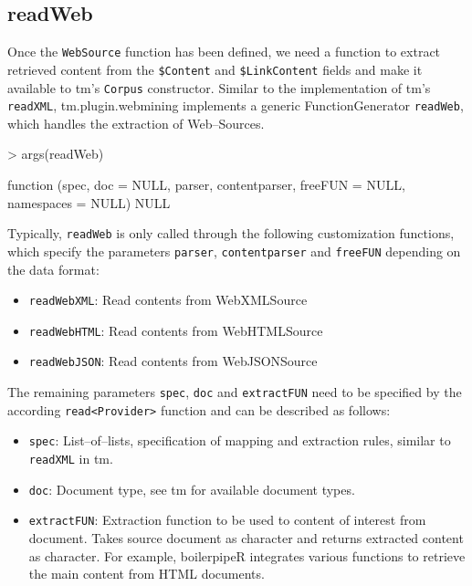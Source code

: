 \documentclass[a4paper]{article}
\let\code=\texttt
\newcommand{\class}[1]{\mbox{\textsf{#1}}}
\newcommand{\pkg}[1]{{\normalfont\fontseries{b}\selectfont #1}}
\newcommand{\proglang}[1]{\textsf{#1}}
\newcommand{\fkt}[1]{\code{#1}}
\newcommand{\field}[1]{\code{\$#1}}
\begin{document}
\subsection{readWeb}
Once the \fkt{WebSource} function has been defined, we need a function to extract retrieved content from
the \field{Content} and \field{LinkContent} fields and make it available to \pkg{tm}'s \fkt{Corpus}
constructor. Similar to the implementation of \pkg{tm}'s \fkt{readXML}, \pkg{tm.plugin.webmining} implements a 
generic \class{FunctionGenerator} \fkt{readWeb}, which handles the extraction of Web--\class{Source}s.

\begin{Schunk}
\begin{Sinput}
> args(readWeb)
\end{Sinput}
\begin{Soutput}
function (spec, doc = NULL, parser, contentparser, freeFUN = NULL, 
    namespaces = NULL) 
NULL
\end{Soutput}
\end{Schunk}

Typically, \fkt{readWeb} is only called through the following customization functions, which specify
the parameters \code{parser}, \code{contentparser} and \code{freeFUN} depending on the data format:

\begin{itemize}
\item \fkt{readWebXML}: Read contents from \class{WebXMLSource}
\item \fkt{readWebHTML}: Read contents from \class{WebHTMLSource}
\item \fkt{readWebJSON}: Read contents from \class{WebJSONSource}
\end{itemize}

The remaining parameters \code{spec}, \code{doc} and \code{extractFUN} need to be specified by the
according \fkt{read<Provider>} function and can be described as follows:
\begin{itemize}
\item \code{spec}: List--of--lists, specification of mapping and extraction rules, similar to \fkt{readXML} in \pkg{tm}.
\item \code{doc}: Document type, see \pkg{tm} for available document types.
\item \code{extractFUN}: Extraction function to be used to content of interest from document. Takes source
document as \class{character} and returns extracted content as \class{character}. For example, \pkg{boilerpipeR} 
integrates various functions to retrieve the main content from \proglang{HTML} documents.
\end{itemize}
\end{document}
